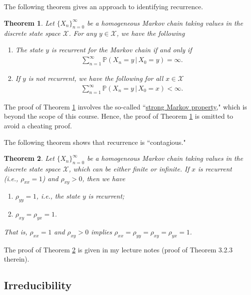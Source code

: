 \documentclass[11pt,letterpaper, leqno]{article}
\newtheorem{theorem}{Theorem}
\numberwithin{equation}{section}
\numberwithin{theorem}{section}
\numberwithin{lemma}{section}
\numberwithin{corollary}{section}
\numberwithin{definition}{section}
\numberwithin{proposition}{section}
\numberwithin{remark}{section}
\numberwithin{example}{section}
\begin{document}
The following theorem gives an approach to identifying recurrence.
\begin{theorem}\label{thm: optional, only for HW}
        Let $\{X_n\}_{n=0}^\infty$ be a homogeneous Markov chain taking values in the discrete state space $\mathcal{X}$. For any $y\in\mathcal{X}$, we have the following 
    \begin{enumerate}
        \item The state $y$ is recurrent for the Markov chain if and only if
    \begin{align*}
        \sum_{n=1}^\infty \mathbb{P}(X_n=y \,\vert\, X_0=y) = \infty.
    \end{align*}
    \item If $y$ is not recurrent, we have the following for all $x\in\mathcal{X}$
    \begin{align*}
        \sum_{n=1}^\infty \mathbb{P}(X_n=y \,\vert\, X_0=x) < \infty.
    \end{align*}
    \end{enumerate}
\end{theorem}
\noindent The proof of Theorem \ref{thm: optional, only for HW} involves the so-called ``\href{https://en.wikipedia.org/wiki/Markov_property}{strong Markov property}," which is beyond the scope of this course. Hence, the proof of Theorem \ref{thm: optional, only for HW} is omitted to avoid a cheating proof.

The following theorem shows that recurrence is ``contagious."
\begin{theorem}\label{thm: recurrence is contagious}
Let $\{X_n\}_{n=0}^\infty$ be a homogeneous Markov chain taking values in the discrete state space $\mathcal{X}$, which can be either finite or infinite. If $x$ is recurrent (i.e., $\rho_{xx}=1$) and $\rho_{xy}>0$, then we have
\begin{enumerate}
    \item $\rho_{yy}=1$, i.e., the state $y$ is recurrent;
    \item $\rho_{xy}=\rho_{yx}=1$.
\end{enumerate}
That is, $\rho_{xx}=1$ and $\rho_{xy}>0$ implies $\rho_{xx}=\rho_{yy}=\rho_{xy}=\rho_{yx}=1$.
\end{theorem}
\noindent The proof of Theorem \ref{thm: recurrence is contagious} is given in my lecture notes (proof of Theorem 3.2.3 therein).



\subsection{Irreducibility}
\end{document}
